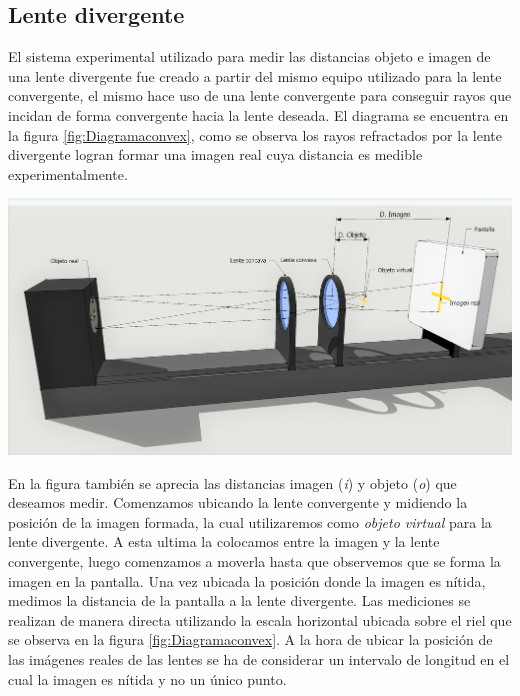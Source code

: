 \documentclass[a4paper,12pt]{article}
\newenvironment{Figure}
  {\par\medskip\noindent\minipage{\linewidth}}
  {\endminipage\par\medskip}
\begin{document}
\begin{multicols*}{2}
    \subsection*{Lente divergente}

        El sistema experimental utilizado para medir las distancias objeto e imagen de una lente divergente fue creado a partir del mismo equipo utilizado para la lente convergente, el mismo hace uso de una lente convergente para conseguir rayos que incidan de forma convergente hacia la lente deseada. El diagrama se encuentra en la figura \ref{fig:Diagramaconvex}, como se observa los rayos refractados por la lente divergente logran formar una imagen real cuya distancia es medible experimentalmente.

        \begin{Figure}
            \centering
            \includegraphics[width=1\linewidth]{DLCX}
            \label{fig:Diagramaconvex}
        \end{Figure}

        En la figura también se aprecia las distancias imagen (\emph{i}) y objeto (\emph{o}) que deseamos medir. Comenzamos ubicando la lente convergente y midiendo la posición de la imagen formada, la cual utilizaremos como \emph{objeto virtual} para la lente divergente. A esta ultima la colocamos entre la imagen y la lente convergente, luego comenzamos a moverla hasta que observemos que se forma la imagen en la pantalla. Una vez ubicada la posición donde la imagen es nítida, medimos la distancia de la pantalla a la lente divergente. Las mediciones se realizan de manera directa utilizando la escala horizontal ubicada sobre el riel que se observa en la figura \ref{fig:Diagramaconvex}. A la hora de ubicar la posición de las imágenes reales de las lentes se ha de considerar un intervalo de longitud en el cual la imagen es nítida y no un único punto.


\end{multicols*}
\end{document}

